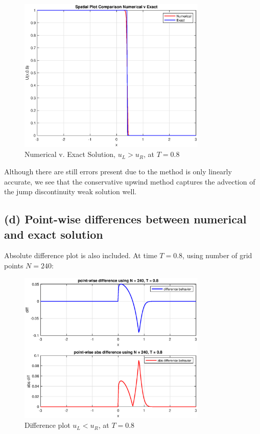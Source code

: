 \documentclass[12pt]{article} %
\begin{document}
\begin{figure}[h!]
\caption{Numerical v. Exact Solution, $u_L > u_R$, at $T = 0.8$}
\centering
\includegraphics[width=0.8\textwidth]{compare2_1.eps}
\end{figure}

Although there are still errors present due to the method is only linearly accurate, we see that the conservative upwind method captures the advection of the jump discontinuity weak solution well.

\newpage
\subsection{(d) Point-wise differences between numerical and exact solution}
Absolute difference plot is also included. At time $T = 0.8$, using number of grid points $N = 240$:
\begin{figure}[h!]
\caption{Difference plot $u_L < u_R$, at $T = 0.8$}
\centering
\includegraphics[width=0.8\textwidth]{diff1.eps}
\end{figure}
\end{document}
